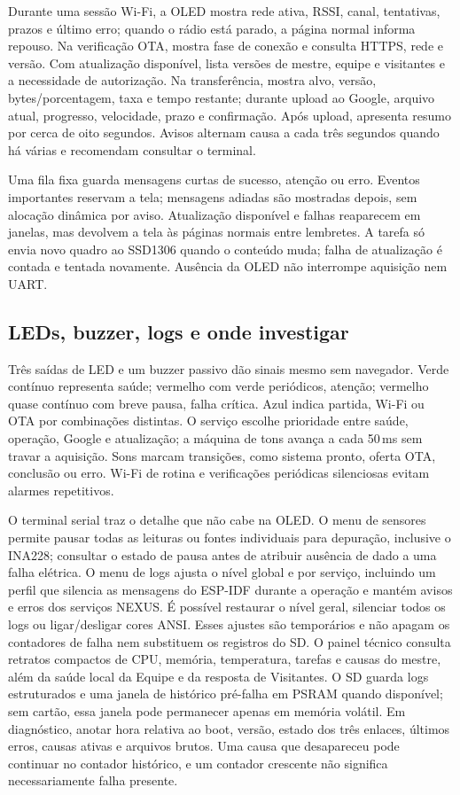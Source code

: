 Durante uma sessão Wi-Fi, a OLED mostra rede ativa, RSSI, canal, tentativas, prazos e último erro; quando o rádio está parado, a página normal informa repouso. Na verificação OTA, mostra fase de conexão e consulta HTTPS, rede e versão. Com atualização disponível, lista versões de mestre, equipe e visitantes e a necessidade de autorização. Na transferência, mostra alvo, versão, bytes/porcentagem, taxa e tempo restante; durante upload ao Google, arquivo atual, progresso, velocidade, prazo e confirmação. Após upload, apresenta resumo por cerca de oito segundos. Avisos alternam causa a cada três segundos quando há várias e recomendam consultar o terminal.

Uma fila fixa guarda mensagens curtas de sucesso, atenção ou erro. Eventos importantes reservam a tela; mensagens adiadas são mostradas depois, sem alocação dinâmica por aviso. Atualização disponível e falhas reaparecem em janelas, mas devolvem a tela às páginas normais entre lembretes. A tarefa só envia novo quadro ao SSD1306 quando o conteúdo muda; falha de atualização é contada e tentada novamente. Ausência da OLED não interrompe aquisição nem UART.

\subsection{LEDs, buzzer, logs e onde investigar}
Três saídas de LED e um buzzer passivo dão sinais mesmo sem navegador. Verde contínuo representa saúde; vermelho com verde periódicos, atenção; vermelho quase contínuo com breve pausa, falha crítica. Azul indica partida, Wi-Fi ou OTA por combinações distintas. O serviço escolhe prioridade entre saúde, operação, Google e atualização; a máquina de tons avança a cada 50\,ms sem travar a aquisição. Sons marcam transições, como sistema pronto, oferta OTA, conclusão ou erro. Wi-Fi de rotina e verificações periódicas silenciosas evitam alarmes repetitivos.

O terminal serial traz o detalhe que não cabe na OLED. O menu de sensores permite pausar todas as leituras ou fontes individuais para depuração, inclusive o INA228; consultar o estado de pausa antes de atribuir ausência de dado a uma falha elétrica. O menu de logs ajusta o nível global e por serviço, incluindo um perfil que silencia as mensagens do ESP-IDF durante a operação e mantém avisos e erros dos serviços NEXUS. É possível restaurar o nível geral, silenciar todos os logs ou ligar/desligar cores ANSI. Esses ajustes são temporários e não apagam os contadores de falha nem substituem os registros do SD. O painel técnico consulta retratos compactos de CPU, memória, temperatura, tarefas e causas do mestre, além da saúde local da Equipe e da resposta de Visitantes. O SD guarda logs estruturados e uma janela de histórico pré-falha em PSRAM quando disponível; sem cartão, essa janela pode permanecer apenas em memória volátil. Em diagnóstico, anotar hora relativa ao boot, versão, estado dos três enlaces, últimos erros, causas ativas e arquivos brutos. Uma causa que desapareceu pode continuar no contador histórico, e um contador crescente não significa necessariamente falha presente.
